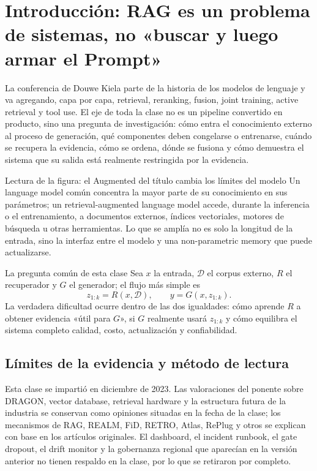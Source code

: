 \section{Introducción: RAG es un problema de sistemas, no «buscar y luego armar el Prompt»}

La conferencia de Douwe Kiela parte de la historia de los modelos de lenguaje y va agregando, capa por capa, retrieval, reranking, fusion, joint training, active retrieval y tool use. El eje de toda la clase no es un pipeline convertido en producto, sino una pregunta de investigación: cómo entra el conocimiento externo al proceso de generación, qué componentes deben congelarse o entrenarse, cuándo se recupera la evidencia, cómo se ordena, dónde se fusiona y cómo demuestra el sistema que su salida está realmente restringida por la evidencia.


\begin{knowledgebox}{Lectura de la figura: el Augmented del título cambia los límites del modelo}
Un language model común concentra la mayor parte de su conocimiento en sus parámetros; un retrieval-augmented language model accede, durante la inferencia o el entrenamiento, a documentos externos, índices vectoriales, motores de búsqueda u otras herramientas. Lo que se amplía no es solo la longitud de la entrada, sino la interfaz entre el modelo y una non-parametric memory que puede actualizarse.
\end{knowledgebox}

\begin{importantbox}{La pregunta común de esta clase}
Sea $x$ la entrada, $\mathcal{D}$ el corpus externo, $R$ el recuperador y $G$ el generador; el flujo más simple es
\[
z_{1:k}=R(x,\mathcal{D}),\qquad
y=G(x,z_{1:k}).
\]
La verdadera dificultad ocurre dentro de las dos igualdades: cómo aprende $R$ a obtener evidencia «útil para $G$», si $G$ realmente usará $z_{1:k}$ y cómo equilibra el sistema completo calidad, costo, actualización y confiabilidad.
\end{importantbox}

\subsection{Límites de la evidencia y método de lectura}

Esta clase se impartió en diciembre de 2023. Las valoraciones del ponente sobre DRAGON, vector database, retrieval hardware y la estructura futura de la industria se conservan como opiniones situadas en la fecha de la clase; los mecanismos de RAG, REALM, FiD, RETRO, Atlas, RePlug y otros se explican con base en los artículos originales. El dashboard, el incident runbook, el gate dropout, el drift monitor y la gobernanza regional que aparecían en la versión anterior no tienen respaldo en la clase, por lo que se retiraron por completo.

